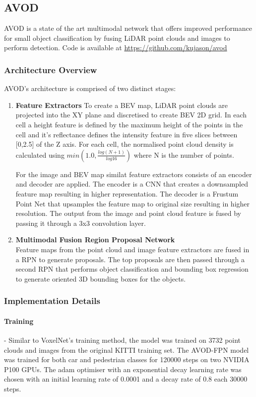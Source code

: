 \subsection{AVOD}
AVOD is a state of the art multimodal network that offers improved performance for small object classification by fusing LiDAR point clouds and images to perform detection. 
Code is available at \url{https://github.com/kujason/avod}
\subsubsection{Architecture Overview}
AVOD's architecture is comprised of two distinct stages: 
\begin{enumerate}
	\item \textbf{Feature Extractors } 
	To create a BEV map, LiDAR point clouds are projected into the XY plane and discretised to create BEV 2D grid. In each cell a height feature is defined by the maximum height of the points in the cell and it's reflectance defines the intensity feature in five slices between [0,2.5] of the Z axis. For each cell, the normalised point cloud density is calculated using $min(1.0, \frac{log(N +1)}{log 16} )$ where N is the number of points. 
	
	For the image and BEV map similat feature extractors consists of an encoder and decoder are applied. The encoder is a CNN that creates a downsampled feature map resulting in higher representation. The decoder is a Frustum Point Net that upsamples the  feature map to original size resulting in higher resolution. The output from the image and point cloud feature is fused by passing it through a 3x3 convolution layer. 
	\item \textbf{Multimodal Fusion Region Proposal Network} \\ 
	Feature maps from the point cloud and image feature extractors are fused in a RPN to generate proposals. The top proposals are then passed through a second RPN that performs object classification and bounding box regression to generate  oriented 3D bounding boxes for the objects.
\end{enumerate}

\subsubsection*{Implementation Details}

\paragraph{Training} -  
Similar to VoxelNet's training method, the model was trained on 3732 point clouds  and images from the original KITTI training set. The AVOD-FPN model was trained for both car and pedestrian classes for 120000 steps on two NVIDIA P100 GPUs. The adam optimiser with an exponential decay learning rate was chosen with an initial learning rate of 0.0001 and a decay rate of 0.8 each 30000 steps. 

